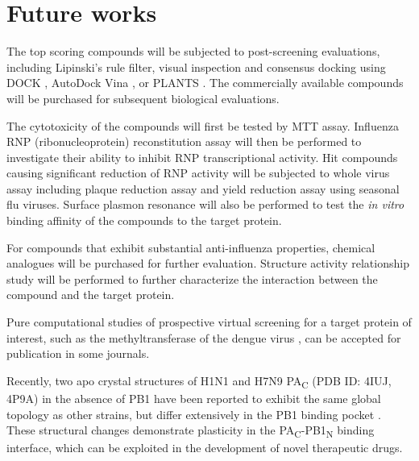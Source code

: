 \section{Future works}

The top scoring compounds will be subjected to post-screening evaluations, including Lipinski's rule filter, visual inspection and consensus docking using DOCK \citep{1222}, AutoDock Vina \citep{595}, or PLANTS \citep{610,607,779}. The commercially available compounds will be purchased for subsequent biological evaluations.

The cytotoxicity of the compounds will first be tested by MTT assay. Influenza RNP (ribonucleoprotein) reconstitution assay will then be performed to investigate their ability to inhibit RNP transcriptional activity. Hit compounds causing significant reduction of RNP activity will be subjected to whole virus assay including plaque reduction assay and yield reduction assay using seasonal flu viruses. Surface plasmon resonance will also be performed to test the \textit{in vitro} binding affinity of the compounds to the target protein. 

For compounds that exhibit substantial anti-influenza properties, chemical analogues will be purchased for further evaluation. Structure activity relationship study will be performed to further characterize the interaction between the compound and the target protein.

Pure computational studies of prospective virtual screening for a target protein of interest, such as the methyltransferase of the dengue virus \citep{1435}, can be accepted for publication in some journals.

Recently, two apo crystal structures of H1N1 and H7N9 PA\textsubscript{C} (PDB ID: 4IUJ, 4P9A) in the absence of PB1 have been reported to exhibit the same global topology as other strains, but differ extensively in the PB1 binding pocket \citep{1585}. These structural changes demonstrate plasticity in the PA\textsubscript{C}-PB1\textsubscript{N} binding interface, which can be exploited in the development of novel therapeutic drugs.

\chapterend

